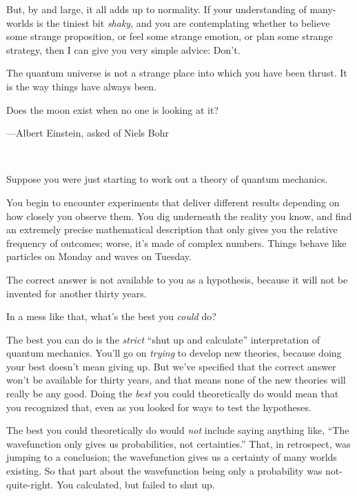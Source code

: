 {
 But, by and large, it all adds up to normality. If your
understanding of many-worlds is the tiniest bit \textit{shaky}, and you
are contemplating whether to believe some strange proposition, or feel
some strange emotion, or plan some strange strategy, then I can give
you very simple advice: Don't.}

{
 The quantum universe is not a strange place into which you have
been thrust. It is the way things have always been.}

\myendsectiontext


\bigskip


{
 Does the moon exist when no one is looking at it?}

{\raggedleft
 {}---Albert Einstein, asked of Niels Bohr
\par}


\bigskip

{
 ~}

{
 Suppose you were just starting to work out a theory of quantum
mechanics.}

{
 You begin to encounter experiments that deliver different results
depending on how closely you observe them. You dig underneath the
reality you know, and find an extremely precise mathematical
description that only gives you the relative frequency of outcomes;
worse, it's made of complex numbers. Things behave like
particles on Monday and waves on Tuesday.}

{
 The correct answer is not available to you as a hypothesis,
because it will not be invented for another thirty years.}

{
 In a mess like that, what's the best you
\textit{could} do?}

{
 The best you can do is the \textit{strict} ``shut
up and calculate'' interpretation of quantum
mechanics. You'll go on \textit{trying} to develop new
theories, because doing your best doesn't mean giving
up. But we've specified that the correct answer
won't be available for thirty years, and that means
none of the new theories will really be any good. Doing the
\textit{best} you could theoretically do would mean that you recognized
that, even as you looked for ways to test the hypotheses.}

{
 The best you could theoretically do would \textit{not} include
saying anything like, ``The wavefunction only gives us
probabilities, not certainties.'' That, in
retrospect, was jumping to a conclusion; the wavefunction gives us a
certainty of many worlds existing. So that part about the wavefunction
being only a probability was not-quite-right. You calculated, but
failed to shut up.}

